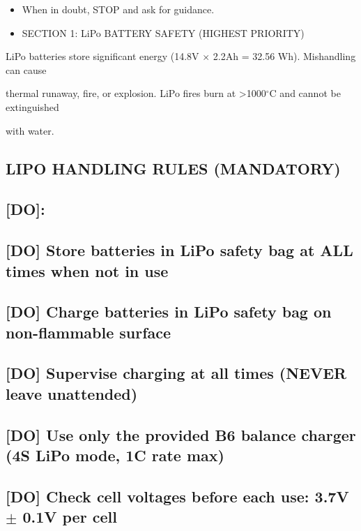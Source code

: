 \documentclass[11pt,letterpaper]{article}
\begin{document}
\begin{itemize}
  \item When in doubt, STOP and ask for guidance.
\end{itemize}

\begin{itemize}
  \item SECTION 1: LiPo BATTERY SAFETY (HIGHEST PRIORITY)
\end{itemize}

LiPo batteries store significant energy (14.8V $\times$ 2.2Ah = 32.56 Wh). Mishandling can cause\par

thermal runaway, fire, or explosion. LiPo fires burn at >1000$^\circ$C and cannot be extinguished\par

with water.\par

\subsection*{LIPO HANDLING RULES (MANDATORY)}

\subsection*{[DO]:}

\subsection*{[DO] Store batteries in LiPo safety bag at ALL times when not in use}

\subsection*{[DO] Charge batteries in LiPo safety bag on non-flammable surface}

\subsection*{[DO] Supervise charging at all times (NEVER leave unattended)}

\subsection*{[DO] Use only the provided B6 balance charger (4S LiPo mode, 1C rate max)}

\subsection*{[DO] Check cell voltages before each use: 3.7V $\pm$ 0.1V per cell}
\end{document}
